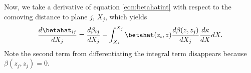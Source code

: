 Now, we take a derivative of equation \ref{eqn:betahatint} with respect to the comoving distance to plane $j$, $X_j$, which yields
\begin{equation}
\label{eqn:dbetahat}
\frac{d \betahat_{i j}}{d X_j} = \frac{d\beta_{i j}}{d X_j} - \int_{X_i}^{X_j} \betahat(z_i, z) \frac{d \beta(z, z_j)}{d X_j} \frac{d \kappa}{d X} d X. 
\end{equation}
Note the second term from differentiating the integral term disappears because $\beta(z_j, z_j) = 0$. 
  
  